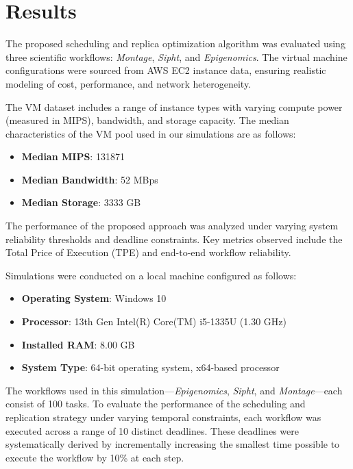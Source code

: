 \documentclass[12pt]{tcc}
\begin{document}
	
	\chapter{Results} 
	\label{sec_result}

The proposed scheduling and replica optimization algorithm was evaluated using three scientific workflows: \textit{Montage}, \textit{Sipht}, and \textit{Epigenomics}. The virtual machine configurations were sourced from AWS EC2 instance data, ensuring realistic modeling of cost, performance, and network heterogeneity.

The VM dataset includes a range of instance types with varying compute power (measured in MIPS), bandwidth, and storage capacity. The median characteristics of the VM pool used in our simulations are as follows:
\begin{itemize}
    \item \textbf{Median MIPS}: 131871
    \item \textbf{Median Bandwidth}: 52 MBps
    \item \textbf{Median Storage}: 3333 GB
\end{itemize}

The performance of the proposed approach was analyzed under varying system reliability thresholds and deadline constraints. Key metrics observed include the Total Price of Execution (TPE) and end-to-end workflow reliability. 

Simulations were conducted on a local machine configured as follows:

\begin{itemize}
    \item \textbf{Operating System}: Windows 10
    \item \textbf{Processor}: 13th Gen Intel(R) Core(TM) i5-1335U (1.30 GHz)
    \item \textbf{Installed RAM}: 8.00 GB
    \item \textbf{System Type}: 64-bit operating system, x64-based processor
\end{itemize}

The workflows used in this simulation—\textit{Epigenomics}, \textit{Sipht}, and \textit{Montage}—each consist of 100 tasks. To evaluate the performance of the scheduling and replication strategy under varying temporal constraints, each workflow was executed across a range of 10 distinct deadlines. These deadlines were systematically derived by incrementally increasing the smallest time possible to execute the workflow by 10\% at each step.
\end{document}
